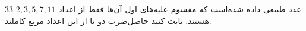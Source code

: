 \EXERCISE
$33$
عدد طبیعی داده شده‌است که مقسوم علیه‌های اول آن‌ها فقط از اعداد
$2, 3, 5, 7, 11$
هستند. ثابت کنید حاصل‌ضرب دو تا از این اعداد مربع کاملند.